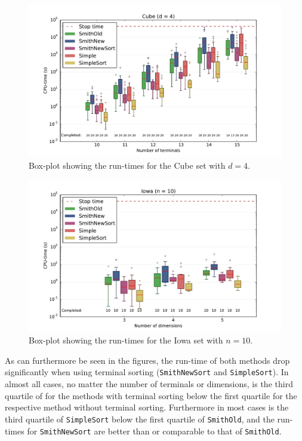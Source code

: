 \begin{figure}[htbp]
  \centering
  \includegraphics[width=\textwidth]{gfx/boxplots/plot_nvst_boxplot_d4_Cube_1}
  \caption[Box-plot for Cube with $d = 4$]{Box-plot showing the run-times for
    the Cube set with $d = 4$.\label{fig:boxplot-cube-d4}}
\end{figure}

\begin{figure}[htbp]
  \centering
  \includegraphics[width=\textwidth]{gfx/boxplots/plot_nvst_boxplot_n10_Iowa_1}
  \caption[Box-plot for Iowa with $n = 10$]{Box-plot showing the run-times for
    the Iowa set with $n = 10$.\label{fig:boxplot-iowa-n10}}
\end{figure}

As can furthermore be seen in the figures, the run-time of both methods drop
significantly when using terminal sorting (\texttt{SmithNewSort} and
\texttt{SimpleSort}). In almost all cases, no matter the number of terminals or dimensions, is
the third quartile of for the methods with terminal sorting below the first
quartile for the respective method without terminal sorting. Furthermore in most
cases is the third quartile of \texttt{SimpleSort} below the first quartile of
\texttt{SmithOld}, and the run-times for \texttt{SmithNewSort} are better than
or comparable to that of \texttt{SmithOld}.

